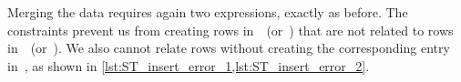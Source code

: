 %
Merging the data requires again two  expressions, exactly as before.
The constraints prevent us from creating rows in~~(or~) that are not related to rows in~~(or~).
We also cannot relate rows without creating the corresponding entry in~, as shown in \cref{lst:ST_insert_error_1,lst:ST_insert_error_2}.%
%
\FloatBarrier%
\endhsection%
%
